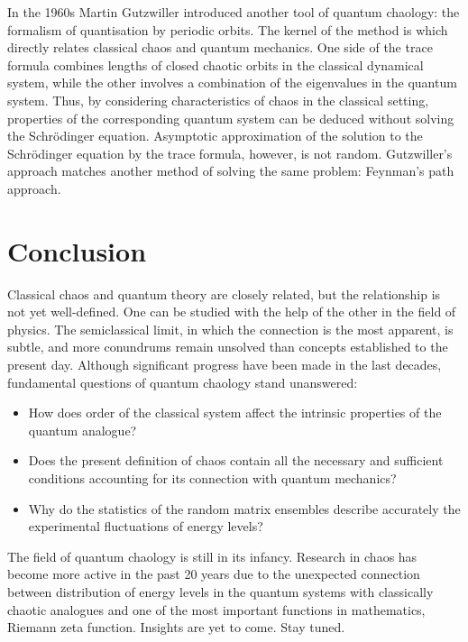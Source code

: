 In the 1960s Martin Gutzwiller introduced another tool of quantum chaology: the formalism of quantisation by periodic orbits.\cite{port, gut}  The kernel of the method is  which directly relates classical chaos and quantum mechanics.\cite{pr} One side of the trace formula combines lengths of closed chaotic orbits in the classical dynamical system, while the other involves a combination of the eigenvalues in the quantum system. Thus, by considering characteristics of chaos in the classical setting, properties of the corresponding quantum system can be deduced without solving the Schr\"{o}dinger equation. Asymptotic approximation of the solution to the Schr\"{o}dinger equation by the trace formula, however, is not random. Gutzwiller's approach matches another method of solving the same problem: Feynman's path approach.\cite{pr}
\section*{Conclusion}
Classical chaos and quantum theory are closely related, but the relationship is not yet well-defined. One can be studied with the help of the other in the field of  physics. The semiclassical limit, in which the connection is the most apparent, is subtle, and more conundrums remain unsolved than concepts established to the present day. Although significant progress have been made in the last decades, fundamental questions of quantum chaology stand unanswered:
\begin{itemize}
\item How does order of the classical system affect the intrinsic properties of the quantum analogue?
\item Does the present definition of chaos contain all the necessary and sufficient conditions accounting for its connection with quantum mechanics?
\item Why do the statistics of the random matrix ensembles describe accurately the experimental fluctuations of energy levels?
\end{itemize}
The field of quantum chaology is still in its infancy. Research in chaos has become more active in the past 20 years due to the unexpected connection between distribution of energy levels in the quantum systems with classically chaotic analogues and one of the most important functions in mathematics, Riemann zeta function. Insights are yet to come. Stay tuned. 
\newpage
